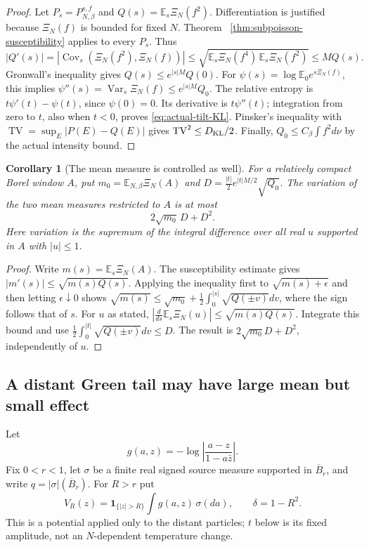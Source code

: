 \documentclass[11pt]{article}
\DeclareMathOperator{\TV}{TV}
\newtheorem{corollary}[theorem]{Corollary}
\theoremstyle{remark}\newtheorem{remark}[theorem]{Remark}
\begin{document}
\begin{proof}
Let $P_s=P_{N,\beta}^{s,f}$ and
$Q(s)=\mathbb E_s\Xi_N(f^2)$. Differentiation is justified because
$\Xi_N(f)$ is bounded for fixed $N$. Theorem~
\ref{thm:subpoisson-susceptibility} applies to every $P_s$. Thus
\[
 |Q'(s)|
 =|\operatorname{Cov}_s(\Xi_N(f^2),\Xi_N(f))|
 \le\sqrt{\mathbb E_s\Xi_N(f^4)\,
                     \mathbb E_s\Xi_N(f^2)}
 \le M Q(s).
\]
Gronwall's inequality gives $Q(s)\le e^{|s|M}Q(0)$.
For $\psi(s)=\log\mathbb E_0e^{s\Xi_N(f)}$, this implies
$\psi''(s)=\operatorname{Var}_s\Xi_N(f)\le e^{|s|M}Q_0$.
The relative entropy is $t\psi'(t)-\psi(t)$, since $\psi(0)=0$.
Its derivative is $t\psi''(t)$; integration from zero to $t$,
also when $t<0$, proves \eqref{eq:actual-tilt-KL}.
Pinsker's inequality with $\TV=\sup_E|P(E)-Q(E)|$ gives
$\TV^2\le D_{\rm KL}/2$. Finally,
$Q_0\le C_\beta\int f^2d\nu$ by the actual intensity bound.
\end{proof}

\begin{corollary}[The mean measure is controlled as well]
\label{cor:actual-tilt-intensity}
For a relatively compact Borel window $A$, put
$m_0=\mathbb E_{N,\beta}\Xi_N(A)$ and
$D=\frac{|t|}{2}e^{|t|M/2}\sqrt{Q_0}$.
The variation of the two mean measures restricted to $A$ is at most
\[
 2\sqrt{m_0}\,D+D^2.
\]
Here variation is the supremum of the integral difference over
all real $u$ supported in $A$ with $|u|\le1$.
\end{corollary}
\begin{proof}
Write $m(s)=\mathbb E_s\Xi_N(A)$. The susceptibility estimate gives
$|m'(s)|\le\sqrt{m(s)Q(s)}$. Applying the inequality first to
$\sqrt{m(s)+\epsilon}$ and then letting $\epsilon\downarrow0$
shows
$\sqrt{m(s)}\le\sqrt{m_0}+\tfrac12\int_0^{|s|}\sqrt{Q(\pm v)}dv$,
where the sign follows that of $s$.
For $u$ as stated,
$|\frac{d}{ds}\mathbb E_s\Xi_N(u)|\le\sqrt{m(s)Q(s)}$.
Integrate this bound and use
$\tfrac12\int_0^{|t|}\sqrt{Q(\pm v)}dv\le D$.
The result is $2\sqrt{m_0}D+D^2$, independently of $u$.
\end{proof}

\subsection{A distant Green tail may have large mean but small effect}

Let
\[
 g(a,z)=-\log\left|\frac{a-z}{1-a\bar z}\right|.
\]
Fix $0<r<1$, let $\sigma$ be a finite real signed source measure
supported in $\overline B_r$, and write $q=|\sigma|(\overline B_r)$.
For $R>r$ put
\[
 V_R(z)=\mathbf1_{\{|z|>R\}}\int g(a,z)\,\sigma(da),
 \qquad \delta=1-R^2.
\]
This is a potential applied only to the distant particles; $t$ below
is its fixed amplitude, not an $N$-dependent temperature change.
\end{document}
